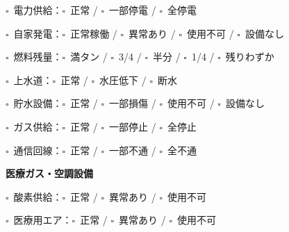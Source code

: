 \documentclass[a4paper,12pt]{jarticle}
\newcommand{\checkbox}{$\square$\ }
\begin{document}
\noindent
\checkbox 電力供給：\quad \checkbox 正常 \quad / \quad \checkbox 一部停電 \quad / \quad \checkbox 全停電

\vspace{2mm}

\noindent
\checkbox 自家発電：\quad \checkbox 正常稼働 \quad / \quad \checkbox 異常あり \quad / \quad \checkbox 使用不可 \quad / \quad \checkbox 設備なし

\vspace{2mm}

\noindent
\checkbox 燃料残量：\quad \checkbox 満タン \quad / \quad \checkbox 3/4 \quad / \quad \checkbox 半分 \quad / \quad \checkbox 1/4 \quad / \quad \checkbox 残りわずか

\vspace{2mm}

\noindent
\checkbox 上水道：\quad \checkbox 正常 \quad / \quad \checkbox 水圧低下 \quad / \quad \checkbox 断水

\vspace{2mm}

\noindent
\checkbox 貯水設備：\quad \checkbox 正常 \quad / \quad \checkbox 一部損傷 \quad / \quad \checkbox 使用不可 \quad / \quad \checkbox 設備なし

\vspace{2mm}

\noindent
\checkbox ガス供給：\quad \checkbox 正常 \quad / \quad \checkbox 一部停止 \quad / \quad \checkbox 全停止

\vspace{2mm}

\noindent
\checkbox 通信回線：\quad \checkbox 正常 \quad / \quad \checkbox 一部不通 \quad / \quad \checkbox 全不通

\vspace{8mm}

\begin{center}
\textbf{\large 医療ガス・空調設備}
\end{center}

\vspace{3mm}

\noindent
\checkbox 酸素供給：\quad \checkbox 正常 \quad / \quad \checkbox 異常あり \quad / \quad \checkbox 使用不可

\vspace{2mm}

\noindent
\checkbox 医療用エア：\quad \checkbox 正常 \quad / \quad \checkbox 異常あり \quad / \quad \checkbox 使用不可

\vspace{2mm}
\end{document}
